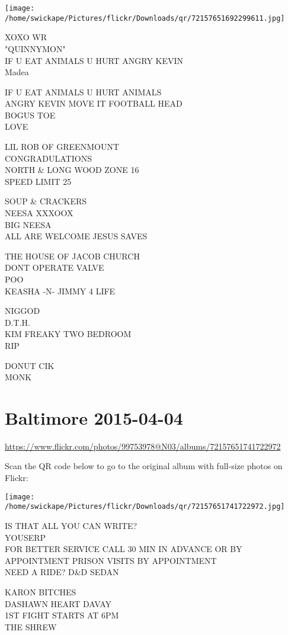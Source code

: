 \documentclass[10pt,letterpaper]{article}
\begin{document}
\texttt{[image: /home/swickape/Pictures/flickr/Downloads/qr/72157651692299611.jpg]}


XOXO WR\\
"QUINNYMON"\\
IF U EAT ANIMALS U HURT ANGRY KEVIN\\
Madea

IF U EAT ANIMALS U HURT ANIMALS\\
ANGRY KEVIN MOVE IT FOOTBALL HEAD\\
BOGUS TOE\\
LOVE

LIL ROB OF GREENMOUNT\\
CONGRADULATIONS\\
NORTH \& LONG WOOD ZONE 16\\
SPEED LIMIT 25

SOUP \& CRACKERS\\
NEESA XXXOOX\\
BIG NEESA\\
ALL ARE WELCOME JESUS SAVES

THE HOUSE OF JACOB CHURCH\\
DONT OPERATE VALVE\\
POO\\
KEASHA {-}N{-} JIMMY 4 LIFE

NIGGOD\\
D.T.H.\\
KIM FREAKY TWO BEDROOM\\
RIP

DONUT CIK\\
MONK


\section*{Baltimore 2015-04-04}

\url{https://www.flickr.com/photos/99753978@N03/albums/72157651741722972}

Scan the QR code below to go to the original album with full-size photos on Flickr:

\texttt{[image: /home/swickape/Pictures/flickr/Downloads/qr/72157651741722972.jpg]}


IS THAT ALL YOU CAN WRITE?\\
YOUSERP\\
FOR BETTER SERVICE CALL 30 MIN IN ADVANCE OR BY APPOINTMENT PRISON VISITS BY APPOINTMENT\\
NEED A RIDE?  D\&D SEDAN

KARON BITCHES\\
DASHAWN HEART DAVAY\\
1ST FIGHT STARTS AT 6PM\\
THE SHREW
\end{document}
